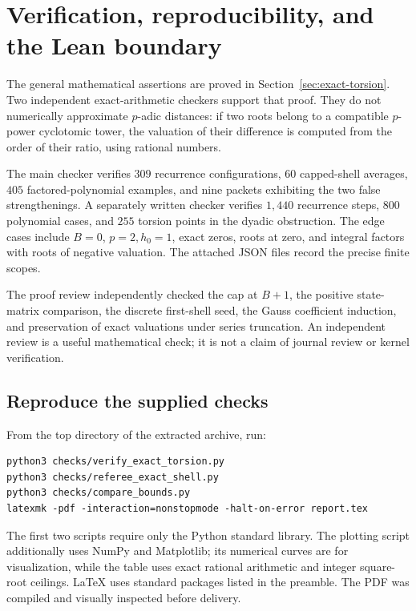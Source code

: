 \section{Verification, reproducibility, and the Lean boundary}
\label{sec:verification}

The general mathematical assertions are proved in
Section~\ref{sec:exact-torsion}. Two independent exact-arithmetic checkers
support that proof. They do not numerically approximate \(p\)-adic
distances: if two roots belong to a compatible \(p\)-power cyclotomic
tower, the valuation of their difference is computed from the order of
their ratio, using rational numbers.

The main checker verifies \(309\) recurrence configurations, \(60\)
capped-shell averages, \(405\) factored-polynomial examples, and nine
packets exhibiting the two false strengthenings. A separately written
checker verifies \(1{,}440\) recurrence steps, \(800\) polynomial cases,
and \(255\) torsion points in the dyadic obstruction. The edge cases
include \(B=0\), \(p=2,h_0=1\), exact zeros, roots at zero, and integral
factors with roots of negative valuation. The attached JSON files record
the precise finite scopes.

The proof review independently checked the cap at \(B+1\), the positive
state-matrix comparison, the discrete first-shell seed, the Gauss
coefficient induction, and preservation of exact valuations under
series truncation. An independent review is a useful mathematical check;
it is not a claim of journal review or kernel verification.

\subsection{Reproduce the supplied checks}

From the top directory of the extracted archive, run:
\begin{verbatim}
python3 checks/verify_exact_torsion.py
python3 checks/referee_exact_shell.py
python3 checks/compare_bounds.py
latexmk -pdf -interaction=nonstopmode -halt-on-error report.tex
\end{verbatim}
The first two scripts require only the Python standard library.
The plotting script additionally uses NumPy and Matplotlib; its numerical
curves are for visualization, while the table uses exact rational arithmetic
and integer square-root ceilings. LaTeX uses standard packages listed in
the preamble. The PDF was compiled and visually inspected before delivery.


